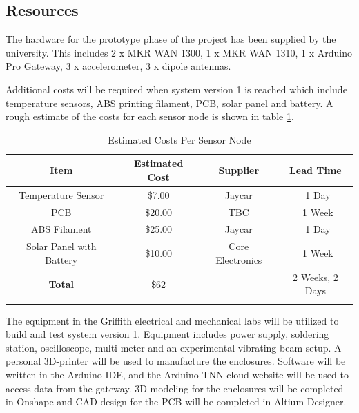 \clearpage
\subsection{Resources}
The hardware for the prototype phase of the project has been supplied by the university. This includes 2 x MKR WAN 1300, 1 x MKR WAN 1310, 1 x Arduino Pro Gateway, 3 x accelerometer, 3 x dipole antennas. 

Additional costs will be required when system version 1 is reached which include temperature sensors, ABS printing filament, PCB, solar panel and battery. A rough estimate of the costs for each sensor node is shown in table \ref{tab:BOM}. 

\begin{longtable}{| c | c | c | c |}
\hline
\textbf{Item}& \textbf{Estimated Cost}& \textbf{Supplier}& \textbf{Lead Time}\\\hline
Temperature Sensor& \$7.00& Jaycar& ~1 Day\\\hline
PCB& \$20.00 & TBC& ~1 Week\\\hline
ABS Filament& \$25.00& Jaycar& ~1 Day\\\hline
Solar Panel with Battery& \$10.00&Core Electronics& ~1 Week\\\hline
\textbf{Total}&\$62& &2 Weeks, 2 Days\\\hline
\caption{Estimated Costs Per Sensor Node}
\label{tab:BOM}
\end{longtable}

The equipment in the Griffith electrical and mechanical labs will be utilized to build and test system version 1. Equipment includes power supply, soldering station, oscilloscope, multi-meter and an experimental vibrating beam setup. A personal 3D-printer will be used to manufacture the enclosures. Software will be written in the Arduino IDE, and the Arduino TNN cloud website will be used to access data from the gateway. 3D modeling for the enclosures will be completed in Onshape and CAD design for the PCB will be completed in Altium Designer.  


